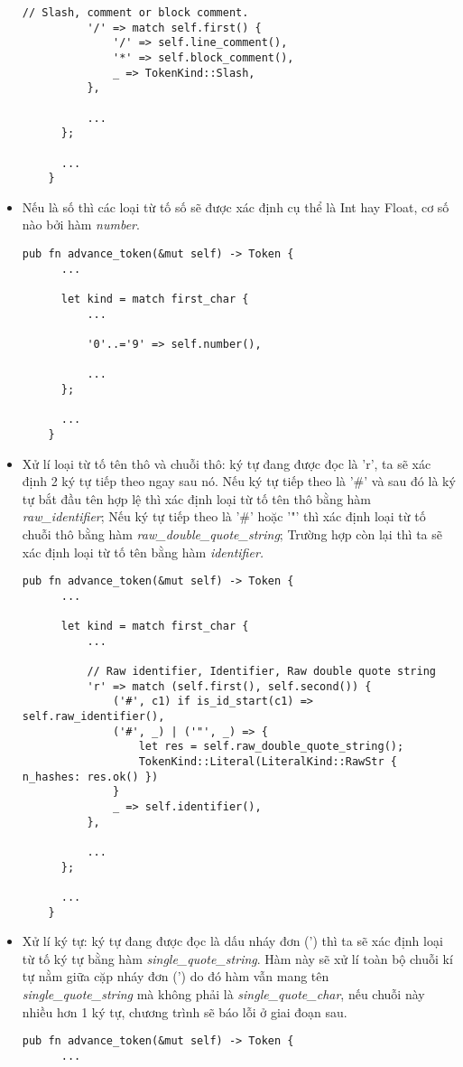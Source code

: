 \begin{itemize}
\begin{lstlisting}[]
          // Slash, comment or block comment.
          '/' => match self.first() {
              '/' => self.line_comment(),
              '*' => self.block_comment(),
              _ => TokenKind::Slash,
          },
  
          ...
      };
  
      ...
    } 
  \end{lstlisting}
  \item Nếu là số thì các loại từ tố số sẽ được xác định cụ thể là Int hay Float, cơ số nào bởi hàm \textit{number}.
  \begin{lstlisting}[]
    pub fn advance_token(&mut self) -> Token {
      ...
  
      let kind = match first_char {
          ...
  
          '0'..='9' => self.number(),
  
          ...
      };
  
      ...
    } 
  \end{lstlisting}
  \item Xử lí loại từ tố tên thô và chuỗi thô: ký tự đang được đọc là 'r', ta sẽ xác định 2 ký tự tiếp theo ngay sau nó. Nếu ký tự tiếp theo là '\#' và sau đó là ký tự bắt đầu tên hợp lệ thì xác định loại từ tố tên thô bằng hàm \textit{raw\_identifier}; Nếu ký tự tiếp theo là '\#' hoặc '"' thì xác định loại từ tố chuỗi thô bằng hàm \textit{raw\_double\_quote\_string}; Trường hợp còn lại thì ta sẽ xác định loại từ tố tên bằng hàm \textit{identifier.}
  \begin{lstlisting}[]
    pub fn advance_token(&mut self) -> Token {
      ...
  
      let kind = match first_char {
          ...
  
          // Raw identifier, Identifier, Raw double quote string
          'r' => match (self.first(), self.second()) {
              ('#', c1) if is_id_start(c1) => self.raw_identifier(),
              ('#', _) | ('"', _) => {
                  let res = self.raw_double_quote_string();
                  TokenKind::Literal(LiteralKind::RawStr { n_hashes: res.ok() })
              }
              _ => self.identifier(),
          },

          ...
      };
  
      ...
    } 
  \end{lstlisting}
  \item Xử lí ký tự: ký tự đang được đọc là dấu nháy đơn (') thì ta sẽ xác định loại từ tố ký tự bằng hàm \textit{single\_quote\_string}. Hàm này sẽ xử lí toàn bộ chuỗi kí tự nằm giữa cặp nháy đơn (') do đó hàm vẫn mang tên \\\textit{single\_quote\_string} mà không phải là \textit{single\_quote\_char}, nếu chuỗi này nhiều hơn 1 ký tự, chương trình sẽ báo lỗi ở giai đoạn sau.
  \begin{lstlisting}[]
    pub fn advance_token(&mut self) -> Token {
      ...
  

\end{lstlisting}
\end{itemize}
